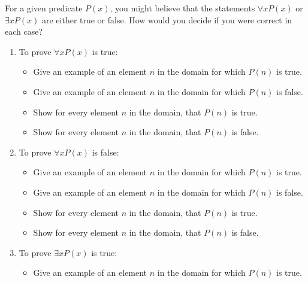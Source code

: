 \documentclass[11pt,]{book}
\theoremstyle{ptxplainnotitle}
\theoremstyle{ptxplaintitle}
\theoremstyle{ptxdefinitionnotitle}
\theoremstyle{ptxdefinitiontitle}
\theoremstyle{ptxdefinitionnotitle}
\theoremstyle{ptxdefinitiontitle}
\theoremstyle{ptxdefinitionnotitle}
\theoremstyle{ptxdefinitiontitle}
\theoremstyle{ptxdefinitiontitlenonumber}
\theoremstyle{ptxdefinitiontitlenonumber}
\numberwithin{equation}{chapter}
\begin{document}
\begin{divisionexercise}{9}\hypertarget{exercise-157}{}
\hypertarget{p-2203}{}%
For a given predicate \(P(x)\text{,}\) you might believe that the statements \(\forall x P(x)\) or \(\exists x P(x)\) are either true or false.  How would you decide if you were correct in each case? \leavevmode%
\begin{enumerate}[label=\alph*.]
\item\hypertarget{li-1085}{}\hypertarget{p-2204}{}%
To prove \(\forall x P(x)\) is true: \par
\begin{itemize}[label=$\odot$,leftmargin=3em,]
\item{}\hypertarget{p-2205}{}%
Give an example of an element \(n\) in the domain for which \(P(n)\) is true.%

\item{}\hypertarget{p-2206}{}%
Give an example of an element \(n\) in the domain for which \(P(n)\) is false.%

\item{}\hypertarget{p-2207}{}%
Show for every element \(n\) in the domain, that \(P(n)\) is true.%

\item{}\hypertarget{p-2208}{}%
Show for every element \(n\) in the domain, that \(P(n)\) is false.%

\end{itemize}
%
\item\hypertarget{li-1090}{}\hypertarget{p-2209}{}%
To prove \(\forall x P(x)\) is false:%
\par
\hypertarget{p-2210}{}%
\par
\begin{itemize}[label=$\odot$,leftmargin=3em,]
\item{}\hypertarget{p-2211}{}%
Give an example of an element \(n\) in the domain for which \(P(n)\) is true.%

\item{}\hypertarget{p-2212}{}%
Give an example of an element \(n\) in the domain for which \(P(n)\) is false.%

\item{}\hypertarget{p-2213}{}%
Show for every element \(n\) in the domain, that \(P(n)\) is true.%

\item{}\hypertarget{p-2214}{}%
Show for every element \(n\) in the domain, that \(P(n)\) is false.%

\end{itemize}
%
\item\hypertarget{li-1095}{}\hypertarget{p-2215}{}%
To prove \(\exists x P(x)\) is true:%
\par
\hypertarget{p-2216}{}%
\par
\begin{itemize}[label=$\odot$,leftmargin=3em,]
\item{}\hypertarget{p-2217}{}%
Give an example of an element \(n\) in the domain for which \(P(n)\) is true.%


\end{itemize}
\end{enumerate}
\end{divisionexercise}
\end{document}
